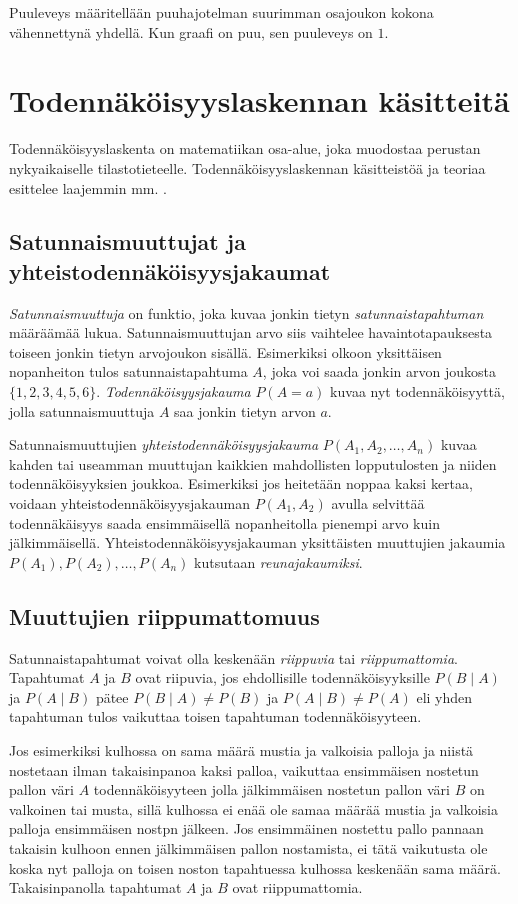 Puuleveys määritellään puuhajotelman suurimman osajoukon kokona vähennettynä yhdellä. Kun graafi on puu, sen puuleveys on $1$.

\section{Todennäköisyyslaskennan käsitteitä}
Todennäköisyyslaskenta on matematiikan osa-alue, joka muodostaa perustan nykyaikaiselle tilastotieteelle. Todennäköisyyslaskennan käsitteistöä ja teoriaa esittelee laajemmin mm. \citet{dasgupta_probability_2011}.

\subsection{Satunnaismuuttujat ja yhteistodennäköisyysjakaumat}
\emph{Satunnaismuuttuja} on funktio, joka kuvaa jonkin tietyn \emph{satunnaistapahtuman} määräämää lukua. Satunnaismuuttujan arvo siis vaihtelee havaintotapauksesta toiseen jonkin tietyn arvojoukon sisällä. Esimerkiksi olkoon yksittäisen nopanheiton tulos satunnaistapahtuma $A$, joka voi saada jonkin arvon joukosta $\{1,2,3,4,5,6\}$. \emph{Todennäköisyysjakauma} $P(A=a)$ kuvaa nyt todennäköisyyttä, jolla satunnaismuuttuja $A$ saa jonkin tietyn arvon $a$.

Satunnaismuuttujien \emph{yhteistodennäköisyysjakauma} $P(A_1, A_2, \ldots ,A_n)$ kuvaa kahden tai useamman muuttujan kaikkien mahdollisten lopputulosten ja niiden todennäköisyyksien joukkoa. Esimerkiksi jos heitetään noppaa kaksi kertaa, voidaan yhteistodennäköisyysjakauman $P(A_1, A_2)$ avulla selvittää todennäkäisyys saada ensimmäisellä nopanheitolla pienempi arvo kuin jälkimmäisellä. Yhteistodennäköisyysjakauman yksittäisten muuttujien jakaumia $P(A_1), P(A_2),\dots, P(A_n)$ kutsutaan \emph{reunajakaumiksi}.

\subsection{Muuttujien riippumattomuus}
Satunnaistapahtumat voivat olla keskenään \emph{riippuvia} tai \emph{riippumattomia}. Tapahtumat $A$ ja $B$ ovat riipuvia, jos ehdollisille todennäköisyyksille $P(B \mid A)$ ja $P(A \mid B)$ pätee $P(B \mid A) \not= P(B)$ ja $P(A \mid B) \not= P(A)$ eli yhden tapahtuman tulos vaikuttaa toisen tapahtuman todennäköisyyteen.

Jos esimerkiksi  kulhossa on sama määrä mustia ja valkoisia palloja ja niistä nostetaan ilman takaisinpanoa kaksi palloa, vaikuttaa ensimmäisen nostetun pallon väri $A$ todennäköisyyteen jolla jälkimmäisen nostetun pallon väri $B$ on valkoinen tai musta, sillä kulhossa ei enää ole samaa määrää mustia ja valkoisia palloja ensimmäisen nostpn jälkeen. Jos ensimmäinen nostettu pallo pannaan takaisin kulhoon ennen jälkimmäisen pallon nostamista, ei tätä vaikutusta ole koska nyt palloja on toisen noston tapahtuessa kulhossa keskenään sama määrä. Takaisinpanolla tapahtumat $A$ ja $B$ ovat riippumattomia. 

